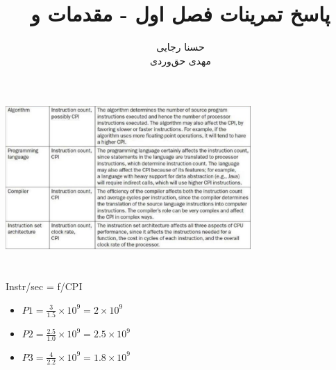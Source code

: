 \documentclass[11pt]{article}
\title{پاسخ تمرینات فصل اول - مقدمات و \lr{Performance}}
\author{
    حسنا رجایی \\
    مهدی‌ حق‌وردی}
\date{}
\begin{document}
\maketitle    
\section{}
\begin{center}
\includegraphics[width=0.7\textwidth, height=0.4\textheight]{1}
\end{center}

\section{}
\subsection{}
\begin{latin}
Instr/sec = f/CPI

\begin{itemize}
    \item 
    $P1 = \frac{3}{1.5} \times 10^9 = 2 \times 10^9$
    \item 
    $P2 = \frac{2.5}{1.0} \times 10^9 = 2.5 \times 10^9$
    \item 
    $P3 = \frac{4}{2.2} \times 10^9 = 1.8 \times 10^9$
\end{itemize}
\end{latin}
\end{document}
